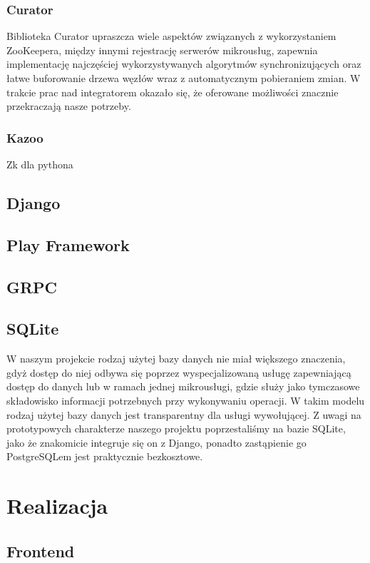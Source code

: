\documentclass[licencjacka]{pracamgr}
\begin{document}
\subsection{Curator}
Biblioteka Curator upraszcza wiele aspektów związanych
z wykorzystaniem ZooKeepera, między innymi rejestrację serwerów mikrousług,
zapewnia implementację najczęściej wykorzystywanych algorytmów synchronizujących
oraz łatwe buforowanie drzewa węzłów wraz z automatycznym pobieraniem zmian. W
trakcie prac nad integratorem okazało się, że oferowane możliwości znacznie przekraczają
nasze potrzeby.

\subsection{Kazoo}
Zk dla pythona

\section{Django}

\section{Play Framework}

\section{GRPC}

\section{SQLite}

W naszym projekcie rodzaj użytej bazy danych nie miał większego znaczenia, gdyż dostęp do niej odbywa się poprzez
wyspecjalizowaną usługę zapewniającą dostęp do danych lub w ramach jednej mikrousługi, gdzie służy jako tymczasowe
składowisko informacji potrzebnych przy wykonywaniu operacji. W takim modelu rodzaj użytej bazy danych jest
transparentny dla usługi wywołującej. Z uwagi na prototypowych charakterze naszego projektu poprzestaliśmy na
bazie SQLite, jako że znakomicie integruje się on z Django, ponadto zastąpienie go PostgreSQLem jest praktycznie bezkosztowe.

\chapter{Realizacja}

\section{Frontend}
\end{document}
